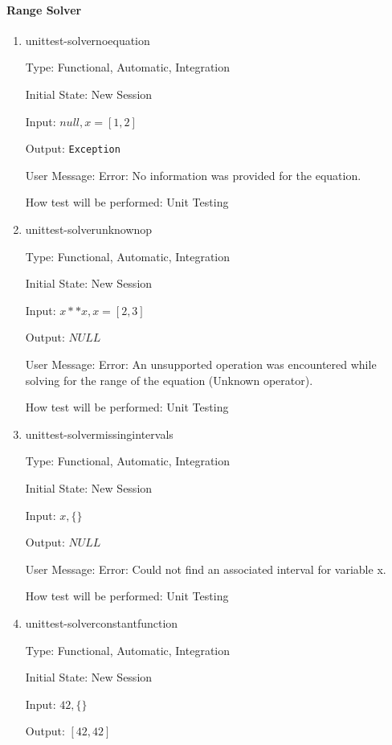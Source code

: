 \documentclass[12pt, titlepage]{article}
\begin{document}
\paragraph{Range Solver}
\begin{enumerate}
	
	\item{unittest-solvernoequation}
	
	Type: Functional, Automatic, Integration
	
	Initial State: New Session
	
	Input: $null, x = [1,2]$
	
	Output: \texttt{Exception}
	
	User Message: Error: No information was provided for the equation.
	
	How test will be performed: Unit Testing\\
	
	\item{unittest-solverunknownop}
	
	Type: Functional, Automatic, Integration
	
	Initial State: New Session
	
	Input: $x**x, x = [2,3]$
	
	Output: $NULL$
	
	User Message: Error: An unsupported operation was encountered while solving 
	for the range of the equation (Unknown operator).
	
	How test will be performed: Unit Testing\\
	
	\item{unittest-solvermissingintervals}
	
	Type: Functional, Automatic, Integration
	
	Initial State: New Session
	
	Input: $x, \{ \}$
	
	Output: $NULL$
	
	User Message: Error: Could not find an associated interval for variable x.
	
	How test will be performed: Unit Testing\\
	
	\item{unittest-solverconstantfunction}
	
	Type: Functional, Automatic, Integration
	
	Initial State: New Session
	
	Input: $42, \{ \}$
	
	Output: $[42,42]$
	

\end{enumerate}
\end{document}

